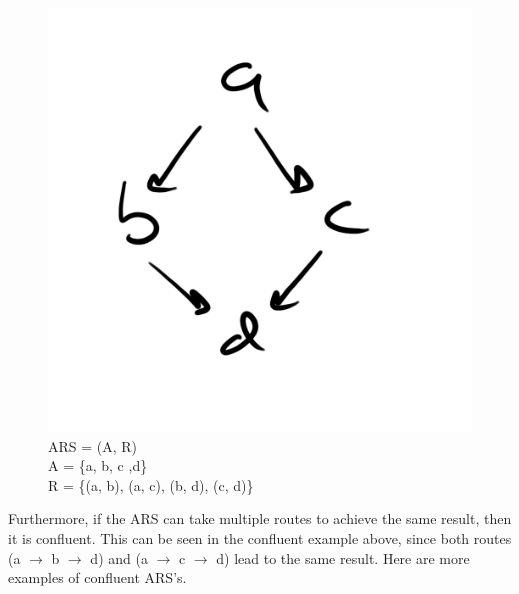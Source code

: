 \documentclass{article}
\begin{document}
{\begin{figure}[h!]
  \centering
  \includegraphics[scale=0.06]{gen14}
  \caption[] {
     ARS = (A, R) \\ A = \{a, b, c ,d\} \\ R = \{(a, b), (a, c), (b, d), (c, d)\}
    \endtabular}
\end{figure}

\medskip\noindent
Furthermore, if the ARS can take multiple routes to achieve the same result, then it is confluent. This can be seen in the confluent example above, since both routes (a $\rightarrow$ b $\rightarrow$ d) and (a $\rightarrow$ c $\rightarrow$ d) lead to the same result. Here are more examples of confluent ARS's.

}
\end{document}

